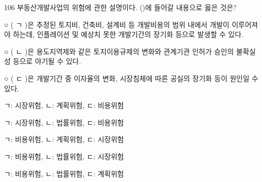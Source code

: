 \begin{question}{106}
부동산개발사업의 위험에 관한 설명이다. (\quad)에 들어갈 내용으로 옳은 것은?
\begin{framedtext}
○ ( ㄱ )은 추정된 토지비, 건축비, 설계비 등 개발비용의 범위 내에서 개발이 이루어져야 하는데, 인플레이션 및 예상치 못한 개발기간의 장기화 등으로 발생할 수 있다. \par
○ ( ㄴ )은 용도지역제와 같은 토지이용규제의 변화와 관계기관 인허가 승인의 불확실성 등으로 야기될 수 있다. \par
○ ( ㄷ )은 개발기간 중 이자율의 변화, 시장침체에 따른 공실의 장기화 등이 원인일 수 있다. \par
\end{framedtext}
\begin{choices}
  \item ㄱ: 시장위험, \quad ㄴ: 계획위험, \quad ㄷ: 비용위험
  \item ㄱ: 시장위험, \quad ㄴ: 법률위험, \quad ㄷ: 비용위험
  \item ㄱ: 비용위험, \quad ㄴ: 계획위험, \quad ㄷ: 시장위험
  \item ㄱ: 비용위험, \quad ㄴ: 법률위험, \quad ㄷ: 시장위험
  \item ㄱ: 비용위험, \quad ㄴ: 법률위험, \quad ㄷ: 계획위험
\end{choices}
\end{question}
